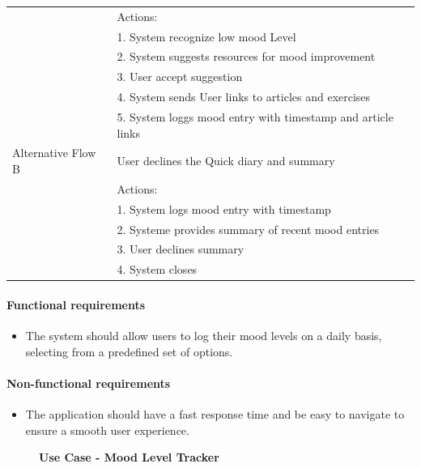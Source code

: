 \documentclass{article}
\begin{document}
\begin{table}[h!]
\begin{tabularx}{\textwidth}{|>{\raggedright\arraybackslash}p{}|X|}
                         & Actions: \\
                         & 1. System recognize low mood Level \\
                         & 2. System suggests resources for mood improvement \\
                         & 3. User accept suggestion \\
                         & 4. System sends User links to articles and exercises \\
                         & 5. System loggs mood entry with timestamp and article links \\ \hline
        Alternative Flow B & User declines the Quick diary and summary  \\
                         & Actions: \\
                         & 1. System logs mood entry with timestamp \\
                         & 2. Systeme provides summary of recent mood entries\\
                         & 3. User declines summary \\
                         & 4. System closes \\ \hline
    \end{tabularx}
\end{table}

\paragraph{Functional requirements}
		\begin{itemize}
			\item  The system should allow users to log their mood levels on a daily basis, selecting from a predefined set of options.
		\end{itemize}
		
	\paragraph{Non-functional requirements}
		\begin{itemize}
			\item The application should have a fast response time and be easy to navigate to ensure a smooth user experience.
		\end{itemize}

\clearpage

\begin{figure}[htbp]
	\textbf{Use Case - Mood Level Tracker}
	\centering
	\begin{subfigure}{\textwidth}
		\resizebox{\textwidth}{!}{}
	\end{subfigure}
	\begin{subfigure}{\textwidth}
	\end{subfigure}
\end{figure}
\end{document}
